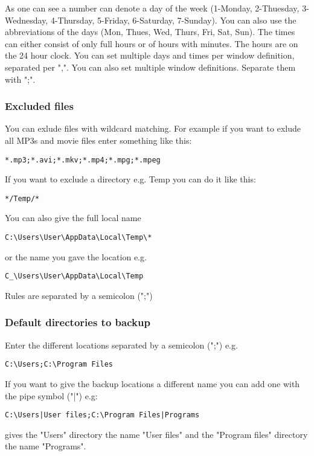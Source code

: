 \documentclass[a4paper,10pt]{article}
\begin{document}
As one can see a number can denote a day of the week (1-Monday, 2-Thuesday, 3-Wednesday, 4-Thursday, 5-Friday, 6-Saturday, 7-Sunday). You can also use the abbreviations of the days (Mon, Thues, Wed, Thurs, Fri, Sat, Sun). The times can either consist of only full hours or of hours with minutes. The hours are on the 24 hour clock. You can set multiple days and times per window definition, separated per ",". You can also set multiple window definitions. Separate them with ";".

\subsubsection{Excluded files}
\label{subsub_excluded_files}

You can exlude files with wildcard matching. For example if you want to exlude all MP3s and movie files enter something like this:
\begin{verbatim}
*.mp3;*.avi;*.mkv;*.mp4;*.mpg;*.mpeg
\end{verbatim}
If you want to exclude a directory e.g. Temp you can do it like this:
\begin{verbatim}
*/Temp/*
\end{verbatim}
You can also give the full local name
\begin{verbatim}
C:\Users\User\AppData\Local\Temp\*
\end{verbatim}
or the name you gave the location e.g.
\begin{verbatim}
C_\Users\User\AppData\Local\Temp
\end{verbatim}

Rules are separated by a semicolon (";")

\subsubsection{Default directories to backup}
\label{subsub_default_dirs}

Enter the different locations separated by a semicolon (";") e.g.
\begin{verbatim}
C:\Users;C:\Program Files
\end{verbatim}
If you want to give the backup locations a different name you can add one with the pipe symbol ("|") e.g:
\begin{verbatim}
C:\Users|User files;C:\Program Files|Programs
\end{verbatim}
gives the "Users" directory the name "User files" and the "Program files" directory the name "Programs".
\end{document}

